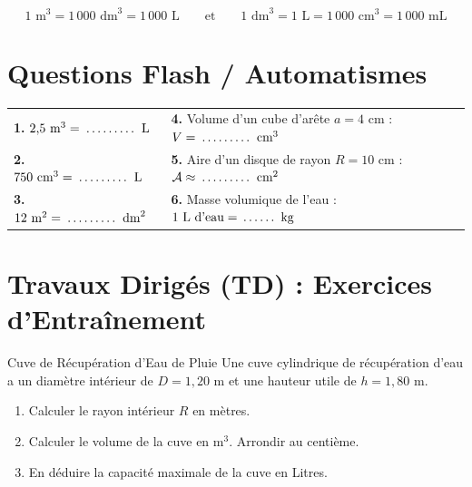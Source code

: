\begin{cadreretenu}
\[ 1\text{ m}^3 = 1\,000\text{ dm}^3 = 1\,000\text{ L} \qquad\text{et}\qquad 1\text{ dm}^3 = 1\text{ L} = 1\,000\text{ cm}^3 = 1\,000\text{ mL} \]
\end{cadreretenu}

\section{Questions Flash / Automatismes}

\begin{automatisme}
\noindent
\begin{tabularx}{\linewidth}{X|X}
\textbf{1.} $2{,}5\text{ m}^3 = \pointille[1.5cm]\text{ L}$ & \textbf{4.} Volume d'un cube d'arête $a = 4\text{ cm}$ : $V = \pointille[1.5cm]\text{ cm}^3$ \\
\textbf{2.} $750\text{ cm}^3 = \pointille[1.5cm]\text{ L}$ & \textbf{5.} Aire d'un disque de rayon $R = 10\text{ cm}$ : $\mathcal{A} \approx \pointille[1.5cm]\text{ cm}^2$ \\
\textbf{3.} $12\text{ m}^2 = \pointille[1.5cm]\text{ dm}^2$ & \textbf{6.} Masse volumique de l'eau : $1\text{ L d'eau} = \pointille[1cm]\text{ kg}$ \\
\end{tabularx}
\end{automatisme}

\section{Travaux Dirigés (TD) : Exercices d'Entraînement}

\begin{exercice}[4 pts]{\capRealiser}{Cuve de Récupération d'Eau de Pluie}
Une cuve cylindrique de récupération d'eau a un diamètre intérieur de $D = 1{,}20\text{ m}$ et une hauteur utile de $h = 1{,}80\text{ m}$.
\begin{enumerate}
    \item Calculer le rayon intérieur $R$ en mètres.
    \item Calculer le volume de la cuve en $\text{m}^3$. Arrondir au centième.
    \item En déduire la capacité maximale de la cuve en Litres.
\end{enumerate}
\lignesreponse[4]
\end{exercice}

